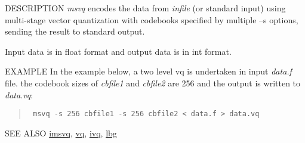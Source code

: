 \begin{synopsis}
\item [msvq] [ --l $L$ ] [ --n $N$ ][ --s $S \;$ {\em cbfile} ] [ --q ] [ {\em infile} ]
\end{synopsis}

\begin{qsection}{DESCRIPTION}
{\em msvq} encodes the data from {\em infile} (or standard input) 
using multi-stage vector quantization 
with codebooks specified by multiple --s options,
sending the result to standard output.

Input data is in float format and output data is in int format.
\end{qsection}

\begin{options}
\end{options}

\begin{qsection}{EXAMPLE}
In the example below, a two level vq is undertaken in input {\em data.f}
file. the codebook sizes of 
{\em cbfile1} and {\em cbfile2} are 256 and the output is written
to {\em data.vq}:
\begin{quote}
\verb! msvq -s 256 cbfile1 -s 256 cbfile2 < data.f > data.vq!
\end{quote} 
\end{qsection}

\begin{qsection}{SEE ALSO}
\hyperlink{imsvq}{imsvq},
\hyperlink{vq}{vq},
\hyperlink{ivq}{ivq},
\hyperlink{lbg}{lbg}
\end{qsection}
